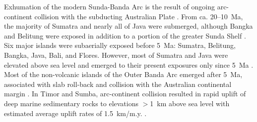 \documentclass[11pt,letterpaper]{article}
\begin{document}
Exhumation of the modern Sunda-Banda Arc is the result of ongoing arc-continent collision with the subducting Australian Plate \citep{Harris2006a}. From ca. 20--10~Ma, the majority of Sumatra and nearly all of Java were submerged, although Bangka and Belitung were exposed in addition to a portion of the greater Sunda Shelf \citep{Hall2009a, Hall2013b}. Six major islands were subaerially exposed before 5~Ma: Sumatra, Belitung, Bangka, Java, Bali, and Flores. However, most of Sumatra and Java were elevated above sea level and emerged to their present exposures only since 5~Ma \citep{Hall2009a, Hall2013b}. Most of the non-volcanic islands of the Outer Banda Arc emerged after 5~Ma, associated with slab roll-back and collision with the Australian continental margin \citep{AudleyCharles2004a, Harris2006a, Hall2013b}. In Timor and Sumba, arc-continent collision resulted in rapid uplift of deep marine sedimentary rocks to elevations $>$1~km above sea level with estimated average uplift rates of 1.5~km/m.y. \citep{AudleyCharles1986a}.

\clearpage

\singlespacing

\newpage



\end{document}
